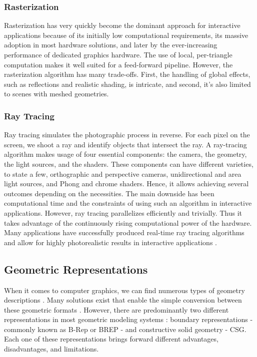 \documentclass[a4paper,11pt,oneside]{article}
\begin{document}
\subsubsection{Rasterization}
    
Rasterization has very quickly become the dominant approach for interactive applications because of its initially low computational requirements, its massive adoption in most hardware solutions, and later by the ever-increasing performance of dedicated graphics hardware. The use of local, per-triangle computation makes it well suited for a feed-forward pipeline. However, the rasterization algorithm has many trade-offs. First, the handling of global effects, such as reflections and realistic shading, is intricate, and second, it's also limited to scenes with meshed geometries.
    
\subsubsection{Ray Tracing}
     
Ray tracing simulates the photographic process in reverse. For each pixel on the screen, we shoot a ray and identify objects that intersect the ray. A ray-tracing algorithm makes usage of four essential components: the camera, the geometry, the light sources, and the shaders. These components can have different varieties, to state a few, orthographic and perspective cameras, unidirectional and area light sources, and Phong and chrome shaders. Hence, it allows achieving several outcomes depending on the necessities. The main downside has been computational time and the constraints of using such an algorithm in interactive applications. However, ray tracing parallelizes efficiently and trivially. Thus it takes advantage of the continuously rising computational power of the hardware. Many applications have successfully produced real-time ray tracing algorithms and allow for highly photorealistic results in interactive applications \cite{RT_RT1, RT_RT2}.
    
  
\subsection{Geometric Representations}
\label{sec:geometric_represections}

When it comes to computer graphics, we can find numerous types of geometry descriptions \cite{SOLIDREP_5, SOLIDREP_1, SOLIDREP_2, SOLIDREP_3, COMPUTING_SURVEYS,SOLIDREP_4}. Many solutions exist that enable the simple conversion between these geometric formats \cite{steuer_2012}. However, there are predominantly two different representations in most geometric modeling systems \cite{COMPUTING_SURVEYS}: boundary representations - commonly known as B-Rep or BREP - and constructive solid geometry - CSG. Each one of these representations brings forward different advantages, disadvantages, and limitations.
    
\end{document}
